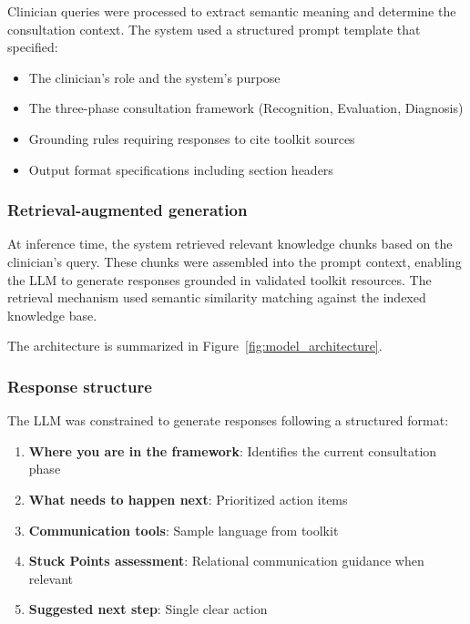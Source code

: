 Clinician queries were processed to extract semantic meaning and determine the consultation context. The system used a structured prompt template that specified:
\begin{itemize}
    \item The clinician's role and the system's purpose
    \item The three-phase consultation framework (Recognition, Evaluation, Diagnosis)
    \item Grounding rules requiring responses to cite toolkit sources
    \item Output format specifications including section headers
\end{itemize}

\subsubsection{Retrieval-augmented generation}

At inference time, the system retrieved relevant knowledge chunks based on the clinician's query. These chunks were assembled into the prompt context, enabling the LLM to generate responses grounded in validated toolkit resources. The retrieval mechanism used semantic similarity matching against the indexed knowledge base.

The architecture is summarized in Figure~\ref{fig:model_architecture}.





\subsubsection{Response structure}

The LLM was constrained to generate responses following a structured format:
\begin{enumerate}
    \item \textbf{Where you are in the framework}: Identifies the current consultation phase
    \item \textbf{What needs to happen next}: Prioritized action items
    \item \textbf{Communication tools}: Sample language from toolkit
    \item \textbf{Stuck Points assessment}: Relational communication guidance when relevant
    \item \textbf{Suggested next step}: Single clear action
\end{enumerate}

